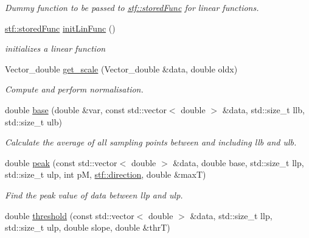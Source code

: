 \begin{DoxyCompactItemize}
\begin{DoxyCompactList}\small\item\em Dummy function to be passed to \hyperlink{structstf_1_1storedFunc}{stf::storedFunc} for linear functions. \item\end{DoxyCompactList}\item 
\hyperlink{structstf_1_1storedFunc}{stf::storedFunc} \hyperlink{group__stfgen_gacce99eda0b9fa51555b8b8adbfef7700}{initLinFunc} ()
\begin{DoxyCompactList}\small\item\em initializes a linear function \item\end{DoxyCompactList}\item 
Vector\_\-double \hyperlink{group__stfgen_ga89d5f83830be9b0132ddb34c5d46d281}{get\_\-scale} (Vector\_\-double \&data, double oldx)
\begin{DoxyCompactList}\small\item\em Compute and perform normalisation. \item\end{DoxyCompactList}\item 
double \hyperlink{group__stfgen_ga365e8fdc4f5836f495e6f1dd95baf3fa}{base} (double \&var, const std::vector$<$ double $>$ \&data, std::size\_\-t llb, std::size\_\-t ulb)
\begin{DoxyCompactList}\small\item\em Calculate the average of all sampling points between and including {\itshape llb\/} and {\itshape ulb\/}. \item\end{DoxyCompactList}\item 
double \hyperlink{group__stfgen_ga0f30710d3729c00c31a1aa82d08badff}{peak} (const std::vector$<$ double $>$ \&data, double base, std::size\_\-t llp, std::size\_\-t ulp, int pM, \hyperlink{group__stfgen_gae8845ae2aeaf4b742a905a2a5571fd5a}{stf::direction}, double \&maxT)
\begin{DoxyCompactList}\small\item\em Find the peak value of {\itshape data\/} between {\itshape llp\/} and {\itshape ulp\/}. \item\end{DoxyCompactList}\item 
double \hyperlink{group__stfgen_gaafcb097f10d8179f38881321d7cd86f3}{threshold} (const std::vector$<$ double $>$ \&data, std::size\_\-t llp, std::size\_\-t ulp, double slope, double \&thrT)

\end{DoxyCompactItemize}
